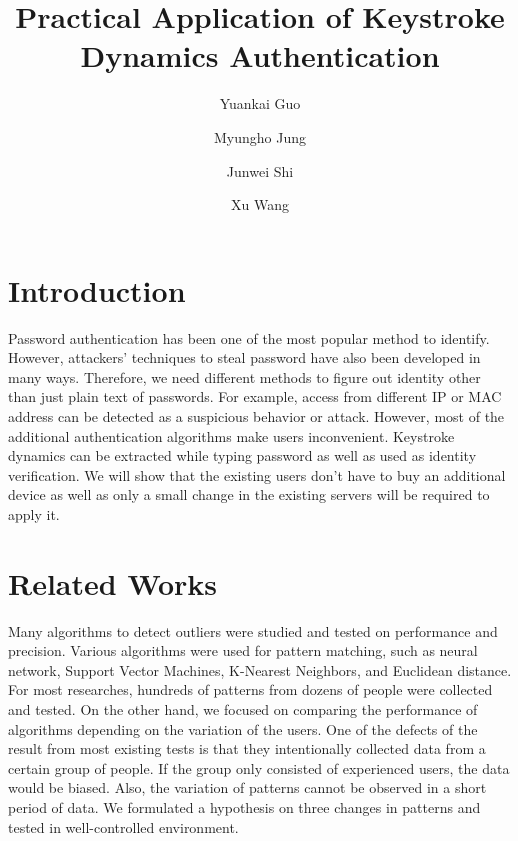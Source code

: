 \documentclass[twocolumn,showpacs,%
  nofootinbib,aps,%
  eqsecnum,prd,notitlepage,showkeys,10pt]{revtex4-1}
\begin{document}
\title{Practical Application of Keystroke Dynamics Authentication}

\author{Yuankai Guo}
\author{Myungho Jung}
\author{Junwei Shi}
\author{Xu Wang}


\maketitle

\section{Introduction}
Password authentication has been one of the most popular method to identify. However, attackers' techniques to steal password have also been developed in many ways. Therefore, we need different methods to figure out identity other than just plain text of passwords. For example, access from different IP or MAC address can be detected as a suspicious behavior or attack. However, most of the additional authentication algorithms make users inconvenient. Keystroke dynamics can be extracted while typing password as well as used as identity verification\cite{gaines1980authentication}. We will show that the existing users don't have to buy an additional device as well as only a small change in the existing servers will be required to apply it.

\section{Related Works}
Many algorithms to detect outliers were studied and tested on performance and precision\cite{shanmugapriya2009survey}. Various algorithms were used for pattern matching, such as neural network, Support Vector Machines, K-Nearest Neighbors, and Euclidean distance. For most researches, hundreds of patterns from dozens of people were collected and tested. On the other hand, we focused on comparing the performance of algorithms depending on the variation of the users. One of the defects of the result from most existing tests is that they intentionally collected data from a certain group of people. If the group only consisted of experienced users, the data would be biased. Also, the variation of patterns cannot be observed in a short period of data. We formulated a hypothesis on three changes in patterns and tested in well-controlled environment.
\end{document}
